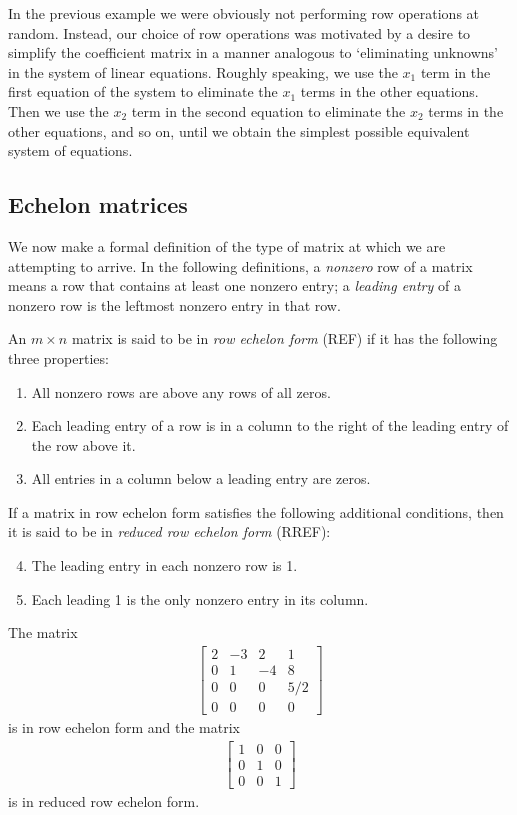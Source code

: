 \documentclass[12pt,letterpaper,reqno]{article}
\numberwithin{equation}{section}
\newcommand{\ti}[1]{\textit{#1}}
\begin{document}
In the previous example we were obviously not performing row operations at random. Instead, our choice of row operations was motivated by a desire to simplify the coefficient matrix in a manner analogous to `eliminating unknowns' in the system of linear equations. Roughly speaking, we use the $x_1$ term in the first equation of the system to eliminate the $x_1$ terms in the other equations. Then we use the $x_2$ term in the second equation to eliminate the $x_2$ terms in the other equations, and so on, until we obtain the simplest possible equivalent system of equations. 

\subsection{Echelon matrices}
We now make a formal definition of the type of matrix at which we are attempting to arrive. In the following definitions, a \ti{nonzero} row of a matrix means a row that contains at least one nonzero entry; a \ti{leading entry} of a nonzero row is the leftmost nonzero entry in that row.
\begin{defn}
	An $m \times n$ matrix is said to be in \ti{row echelon form} (REF) if it has the following three properties:
	\begin{enumerate}
		\item All nonzero rows are above any rows of all zeros.
		\item Each leading entry of a row is in a column to the right of the leading entry of the row above it.
		\item All entries in a column below a leading entry are zeros.
	\end{enumerate}
If a matrix in row echelon form satisfies the following additional conditions, then it is said to be in \ti{reduced row echelon form} (RREF):
\begin{enumerate}
\setcounter{enumi}{3}
	\item The leading entry in each nonzero row is 1.
	\item Each leading 1 is the only nonzero entry in its column.
\end{enumerate}
\end{defn}

\begin{example}
The matrix
\begin{align*}
	\begin{bmatrix}
	2&-3&2&1 \\
	0&1&-4&8 \\
	0&0&0&5/2 \\
	0&0&0&0
\end{bmatrix}
\end{align*}
is in row echelon form and the matrix 
\begin{align*}
	\begin{bmatrix}
	1&0&0 \\ 0 & 1 & 0 \\ 0&0&1
\end{bmatrix}
\end{align*}
is in reduced row echelon form.	
\end{example}
\end{document}
